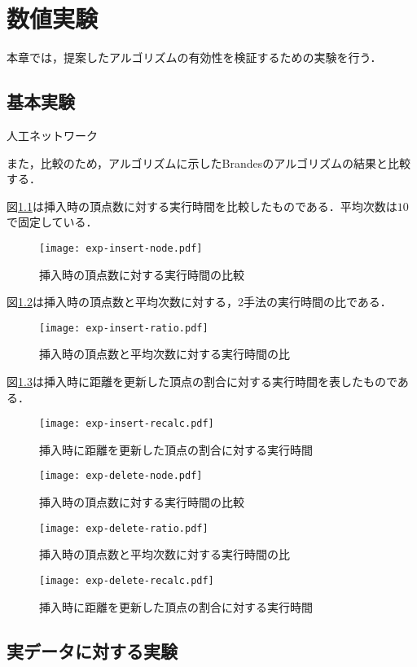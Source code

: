 \chapter{数値実験}

本章では，提案したアルゴリズムの有効性を検証するための実験を行う．

\section{基本実験}

人工ネットワーク

また，比較のため，アルゴリズムに示したBrandesのアルゴリズムの結果と比較する．

図\ref{fig:exp-insert-node}は挿入時の頂点数に対する実行時間を比較したものである．平均次数は$10$で固定している．

\begin{figure}[tb]
  \centering
  \texttt{[image: exp-insert-node.pdf]}
  \caption{挿入時の頂点数に対する実行時間の比較}
  \label{fig:exp-insert-node}
\end{figure}

図\ref{fig:exp-insert-ratio}は挿入時の頂点数と平均次数に対する，2手法の実行時間の比である．

\begin{figure}[tb]
  \centering
  \texttt{[image: exp-insert-ratio.pdf]}
  \caption{挿入時の頂点数と平均次数に対する実行時間の比}
  \label{fig:exp-insert-ratio}
\end{figure}

図\ref{fig:exp-insert-recalc}は挿入時に距離を更新した頂点の割合に対する実行時間を表したものである．

\begin{figure}[tb]
  \centering
  \texttt{[image: exp-insert-recalc.pdf]}
  \caption{挿入時に距離を更新した頂点の割合に対する実行時間}
  \label{fig:exp-insert-recalc}
\end{figure}

\begin{figure}[tb]
  \centering
  \texttt{[image: exp-delete-node.pdf]}
  \caption{挿入時の頂点数に対する実行時間の比較}
  \label{fig:exp-delete-node}
\end{figure}

\begin{figure}[tb]
  \centering
  \texttt{[image: exp-delete-ratio.pdf]}
  \caption{挿入時の頂点数と平均次数に対する実行時間の比}
  \label{fig:exp-delete-ratio}
\end{figure}

\begin{figure}[tb]
  \centering
  \texttt{[image: exp-delete-recalc.pdf]}
  \caption{挿入時に距離を更新した頂点の割合に対する実行時間}
  \label{fig:exp-delete-recalc}
\end{figure}

\section{実データに対する実験}
